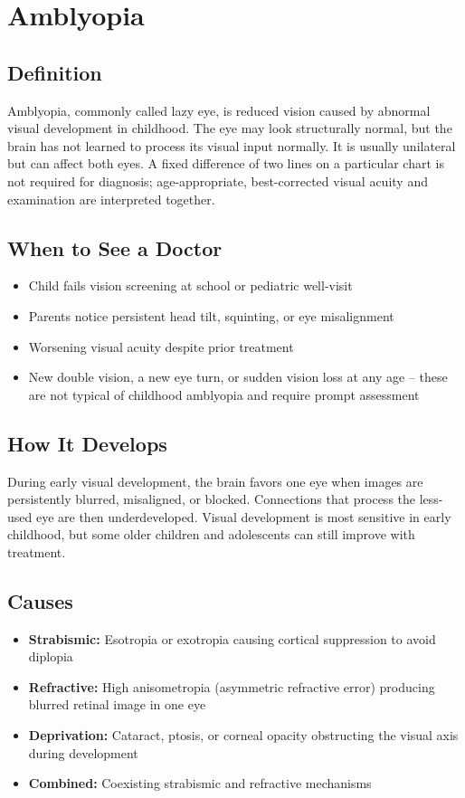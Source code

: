 \chapter{Amblyopia}

\section*{Definition}
Amblyopia, commonly called lazy eye, is reduced vision caused by abnormal visual development in childhood. The eye may look structurally normal, but the brain has not learned to process its visual input normally. It is usually unilateral but can affect both eyes. A fixed difference of two lines on a particular chart is not required for diagnosis; age-appropriate, best-corrected visual acuity and examination are interpreted together.

\section*{When to See a Doctor}

\begin{itemize}
 \item Child fails vision screening at school or pediatric well-visit
 \item Parents notice persistent head tilt, squinting, or eye misalignment
 \item Worsening visual acuity despite prior treatment
 \item New double vision, a new eye turn, or sudden vision loss at any age -- these are not typical of childhood amblyopia and require prompt assessment
\end{itemize}

\section*{How It Develops}
During early visual development, the brain favors one eye when images are persistently blurred, misaligned, or blocked. Connections that process the less-used eye are then underdeveloped. Visual development is most sensitive in early childhood, but some older children and adolescents can still improve with treatment.

\section*{Causes}
\begin{itemize}
 \item \textbf{Strabismic:} Esotropia or exotropia causing cortical suppression to avoid diplopia
 \item \textbf{Refractive:} High anisometropia (asymmetric refractive error) producing blurred retinal image in one eye
 \item \textbf{Deprivation:} Cataract, ptosis, or corneal opacity obstructing the visual axis during development
 \item \textbf{Combined:} Coexisting strabismic and refractive mechanisms
\end{itemize}

